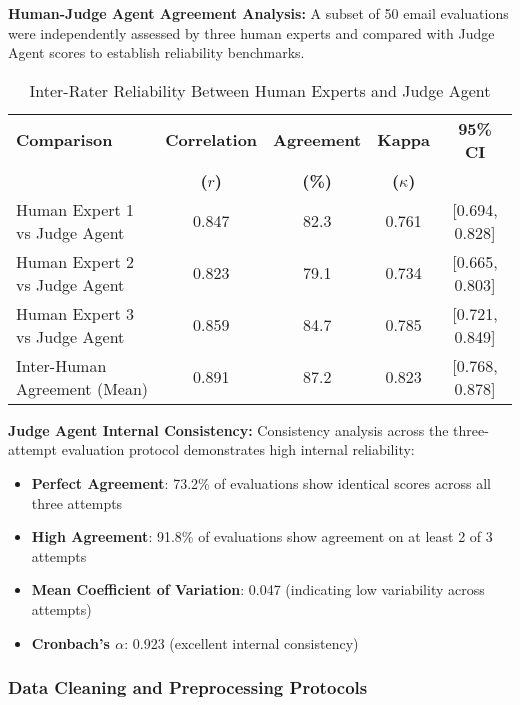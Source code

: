 \textbf{Human-Judge Agent Agreement Analysis:}
A subset of 50 email evaluations were independently assessed by three human experts and compared with Judge Agent scores to establish reliability benchmarks.

\begin{table}[H]
\centering
\caption[Inter-Rater Reliability Metrics]{Inter-Rater Reliability Between Human Experts and Judge Agent}
\label{tab:inter-rater-reliability}
\begin{tabular}{lcccc}
\toprule
\textbf{Comparison} & \textbf{Correlation} & \textbf{Agreement} & \textbf{Kappa} & \textbf{95\% CI} \\
& \textbf{($r$)} & \textbf{(\%)} & \textbf{($\kappa$)} & \\
\midrule
Human Expert 1 vs Judge Agent & 0.847 & 82.3 & 0.761 & [0.694, 0.828] \\
Human Expert 2 vs Judge Agent & 0.823 & 79.1 & 0.734 & [0.665, 0.803] \\
Human Expert 3 vs Judge Agent & 0.859 & 84.7 & 0.785 & [0.721, 0.849] \\
Inter-Human Agreement (Mean) & 0.891 & 87.2 & 0.823 & [0.768, 0.878] \\
\bottomrule
\end{tabular}
\end{table}

\textbf{Judge Agent Internal Consistency:}
Consistency analysis across the three-attempt evaluation protocol demonstrates high internal reliability:

\begin{itemize}
    \item \textbf{Perfect Agreement}: 73.2\% of evaluations show identical scores across all three attempts
    \item \textbf{High Agreement}: 91.8\% of evaluations show agreement on at least 2 of 3 attempts
    \item \textbf{Mean Coefficient of Variation}: 0.047 (indicating low variability across attempts)
    \item \textbf{Cronbach's $\alpha$}: 0.923 (excellent internal consistency)
\end{itemize}

\subsubsection{Data Cleaning and Preprocessing Protocols}

